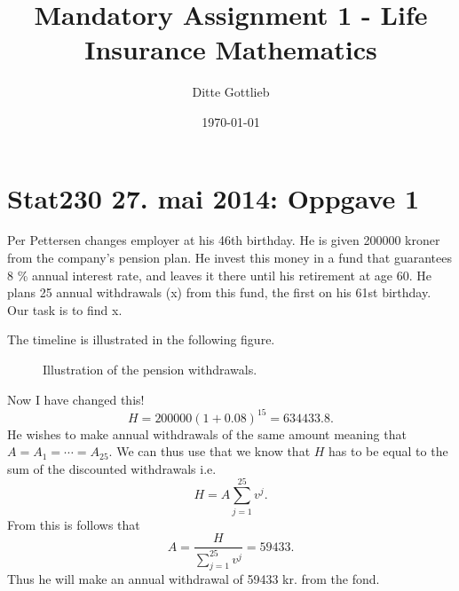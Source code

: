 \documentclass[a4paper,colorinlistoftodos, 10pt]{article}
\title{Mandatory Assignment 1 - Life Insurance Mathematics}
\author{Ditte Gottlieb}
\date{\today}
\begin{document}
\maketitle

\section*{Stat230 27. mai 2014: Oppgave 1}

Per Pettersen changes employer at his 46th birthday. He is given 200000 kroner from
the company’s pension plan. He invest this money in a fund that guarantees 8 \% annual
interest rate, and leaves it there until his retirement at age 60. He plans 25 annual
withdrawals (x) from this fund, the first on his 61st birthday. Our task is to find x.\newline

\noindent The timeline is illustrated in the following figure.
\begin{figure}[ht]
\centering
{}
\caption{Illustration of the pension withdrawals.}
\end{figure}

\noindent Now I have changed this!
\begin{equation*}
    H = 200000 (1 + 0.08)^{15} = 634433.8.
\end{equation*}
He wishes to make annual withdrawals of the same amount meaning that $A = A_1 = \cdots = A_{25}$. We can thus use that we know that $H$ has to be equal to the sum of the discounted withdrawals i.e.
\begin{equation*}
    H = A\sum_{j=1}^{25} v^j.
\end{equation*}
From this is follows that 
\begin{equation*}
    A = \frac{H}{\sum_{j=1}^{25} v^j} = 59433.
\end{equation*}
Thus he will make an annual withdrawal of 59433 kr. from the fond.
\end{document}
